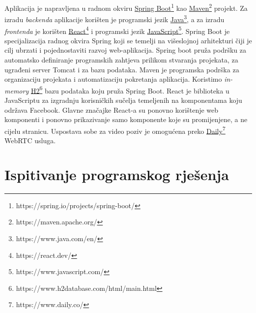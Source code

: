 			\indent Aplikacija je napravljena u radnom okviru \href{https://spring.io/projects/spring-boot/}{Spring Boot\footnote{https://spring.io/projects/spring-boot/}} kao \href{https://maven.apache.org/}{Maven\footnote{https://maven.apache.org/}} projekt. Za izradu \textit{backenda} aplikacije korišten je programski jezik \href{https://www.java.com/en/}{Java\footnote{https://www.java.com/en/}}, a za izradu \textit{frontenda} je korišten \href{https://react.dev/}{React\footnote{https://react.dev/}} i programski jezik \href{https://www.javascript.com/}{JavaScript\footnote{https://www.javascript.com/}}. Spring Boot je specijalizacija radnog okvira Spring koji se temelji na višeslojnoj arhitekturi čiji je cilj ubrzati i pojednostaviti razvoj web-aplikacija. Spring boot pruža podršku za automatsko definiranje programskih zahtjeva prilikom stvaranja projekata, za ugrađeni server Tomcat i za bazu podataka. Maven je programska podrška za organizaciju projekata i automatizaciju pokretanja aplikacija. Koristimo \textit{in-memory} \href{https://www.h2database.com/html/main.html}{H2\footnote{https://www.h2database.com/html/main.html}} bazu podataka koju pruža Spring Boot. React je biblioteka u JavaScriptu za izgradnju korisničkih sučelja temeljenih na komponentama koju održava Facebook. Glavne značajke React-a su ponovno korištenje web komponenti i ponovno prikazivanje samo komponente koje su promijenjene, a ne cijelu stranicu. Uspostava sobe za video poziv je omogućena preko \href{https://www.daily.co/}{Daily\footnote{https://www.daily.co/}} WebRTC usluga.

		\eject 
		
	
		\section{Ispitivanje programskog rješenja}
			
			
	
			
